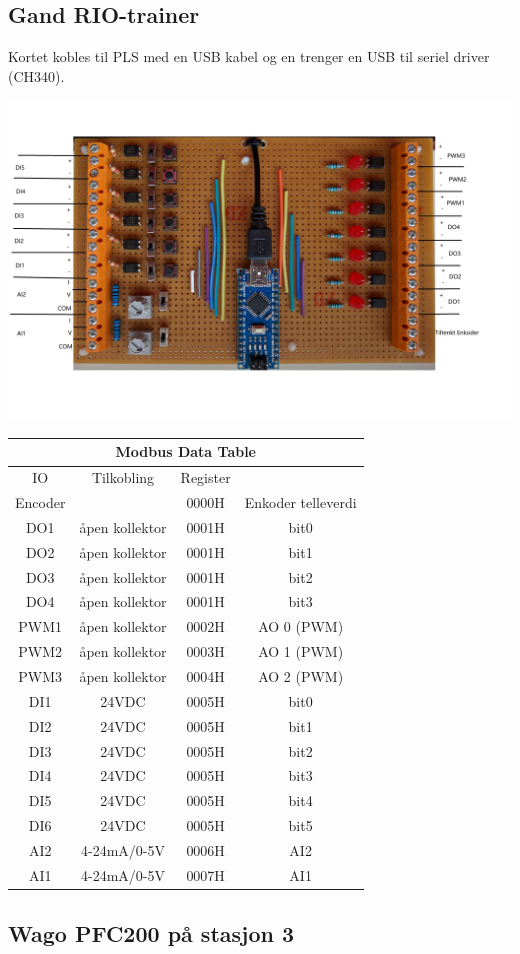 \subsection{Gand RIO-trainer}

Kortet kobles til PLS med en USB kabel og en trenger en USB til seriel
driver (CH340). 

\includegraphics[width=1\textwidth]{./GandRioTrainer.jpg}
\small
\begin{tabular}{|c|c|c|c|}
\hline 
\multicolumn{4}{|c|}{Modbus Data Table}\tabularnewline
\hline 
\hline 
IO & Tilkobling & Register & \tabularnewline
\hline 
Encoder &  & 0000H & Enkoder telleverdi\tabularnewline
\hline 
DO1 & åpen kollektor & 0001H & bit0\tabularnewline
\hline 
DO2 & åpen kollektor & 0001H & bit1\tabularnewline
\hline 
DO3 & åpen kollektor & 0001H & bit2\tabularnewline
\hline 
DO4 & åpen kollektor & 0001H & bit3\tabularnewline
\hline 
PWM1 & åpen kollektor & 0002H & AO 0 (PWM)\tabularnewline
\hline 
PWM2 & åpen kollektor & 0003H & AO 1 (PWM)\tabularnewline
\hline 
PWM3 & åpen kollektor & 0004H & AO 2 (PWM)\tabularnewline
\hline 
DI1 & 24VDC & 0005H & bit0\tabularnewline
\hline 
DI2 & 24VDC & 0005H & bit1\tabularnewline
\hline 
DI3 & 24VDC & 0005H & bit2\tabularnewline
\hline 
DI4 & 24VDC & 0005H & bit3\tabularnewline
\hline 
DI5 & 24VDC & 0005H & bit4\tabularnewline
\hline 
DI6 & 24VDC & 0005H & bit5\tabularnewline
\hline 
AI2 & 4-24mA/0-5V & 0006H & AI2\tabularnewline
\hline 
AI1 & 4-24mA/0-5V & 0007H & AI1\tabularnewline
\hline 
\end{tabular}
\normalsize
\vfil \eject
\subsection{Wago PFC200 på stasjon 3}

